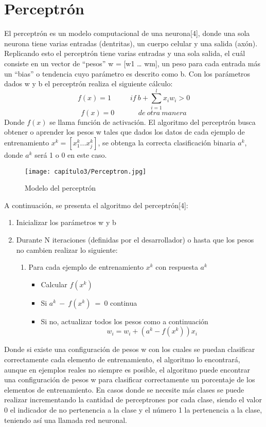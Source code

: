 \section{Perceptrón}
El perceptrón es un modelo computacional de una neurona[4], donde una sola neurona tiene varias entradas (dentritas), un cuerpo celular y una salida (axón). Replicando esto el perceptrón tiene varias entradas y una sola salida, el cuál consiste en un vector de “pesos” w = [w1 … wm], un peso para cada entrada más un “bias” o tendencia cuyo parámetro es descrito como b.
Con los parámetros dados w y b el perceptrón realiza el siguiente cálculo:
$$f\left(x\right)=1\ \ \ \ \ \ \ \ \ \ \ \ if\ b+\sum_{i=1}^{l}{x_iw_i}>0$$
$$f\left(x\right)=0\ \ \ \ \ \ \ \ \ \ \ \ \ \ \ de\ otra\ manera$$
Donde $f\left(x\right)$ se llama función de activación.
El algoritmo del perceptrón busca obtener o aprender los pesos w tales que dados los datos de cada ejemplo de entrenamiento $x^k=\left[x_1^k ... x_j^k\right]$, se obtenga la correcta clasificación binaria $a^k$, donde $a^k$ será 1 o 0 en este caso. 
\begin{figure}[htbp]
\begin{center}
\texttt{[image: capítulo3/Perceptron.jpg]}
\caption{Modelo del perceptrón}
\label{fig:perceptron}
\end{center}
\end{figure}
A continuación, se presenta el algoritmo del perceptrón[4]:
\begin{enumerate}
    \item Inicializar los parámetros w y b
    \item Durante N iteraciones (definidas por el desarrollador) o hasta que los pesos no cambien realizar lo siguiente:
    \begin{enumerate}
        \item Para cada ejemplo de entrenamiento $x^k$ con respuesta $a^k$
             \begin{itemize}
                 \item Calcular $f\left(x^k\right)$
                 \item Si $a^k\ -\ f\left(x^k\right)\ =\ 0$  continua
                 \item Si no, actualizar todos los pesos como a continuación $$ w_i = w_i+\left(a^k-f\left(x^k\right)\right)x_i $$
             \end{itemize}
    \end{enumerate}
\end{enumerate}
Donde si existe una configuración de pesos w con los cuales se puedan clasificar correctamente cada elemento de entrenamiento, el algoritmo lo encontrará, aunque en ejemplos reales no siempre es posible, el algoritmo puede encontrar una configuración de pesos w para clasificar correctamente un porcentaje de los elementos de entrenamiento.
En casos donde se necesite más clases se puede realizar incrementando la cantidad de perceptrones por cada clase, siendo el valor 0 el indicador de no pertenencia a la clase y el número 1 la pertenencia a la clase, teniendo así una llamada red neuronal.
